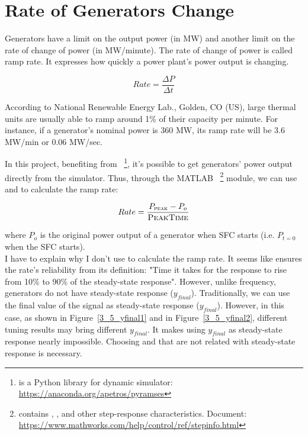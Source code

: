 \section{Rate of Generators Change} %
\label{section3.5}
Generators have a limit on the output power (in MW) and another limit on the rate of change of power (in MW/minute). The rate of change of power is called ramp rate. It expresses how quickly a power plant's power output is changing. 

\begin{equation}
    Rate = \frac{\Delta P}{\Delta t}
\end{equation}


According to National Renewable Energy Lab., Golden, CO (US), \cite{osti_15016292} large thermal units are usually able to ramp around 1\% of their capacity per minute. For instance, if a generator's nominal power is 360 MW, its ramp rate will be 3.6 MW/min or 0.06 MW/sec.

In this project, benefiting from ~\footnote{ is a Python library for  dynamic simulator: \href{https://anaconda.org/apetros/pyramses}{https://anaconda.org/apetros/pyramses}}, it's possible to get generators' power output directly from the simulator. Thus, through the MATLAB ~\footnote{ contains , , and other step-response characteristics. Document: \href{https://www.mathworks.com/help/control/ref/stepinfo.html}{https://www.mathworks.com/help/control/ref/stepinfo.html}} module, we can use  and  to calculate the ramp rate:

\begin{equation}
    Rate = \frac{P_{\textsc{peak}} - P_o}{\textsc{PeakTime}}
\end{equation}

where $P_o$ is the original power output of a generator when SFC starts (i.e. $P_{t=0}$ when the SFC starts).\\

I have to explain why I don't use  to calculate the ramp rate. It seems like  ensures the rate's reliability from its definition: "Time it takes for the response to rise from 10\% to 90\% of the steady-state response". However, unlike frequency, generators do not have steady-state response ($y_{final}$). Traditionally, we can use the final value of the signal as steady-state response ($y_{final}$). However, in this case, as shown in Figure~\ref{3_5_yfinal1} and in Figure~\ref{3_5_yfinal2}, different tuning results may bring different $y_{final}$. It makes using $y_{final}$ as steady-state response nearly impossible. Choosing  and  that are not related with steady-state response is necessary.

